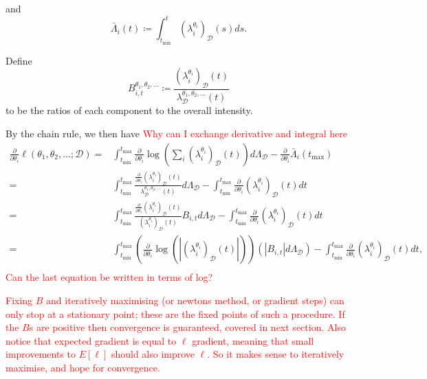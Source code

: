 \documentclass[honours,12pt]{unswthesis}
\numberwithin{equation}{section}
\begin{document}
and
$$\bar\Lambda_i(t) \coloneq \int_{t_\mathrm{min}}^t \left(\lambda_i^{\theta_i}\right)_\mathcal{D}(s)ds.$$

Define
$$B_{i,t}^{\theta_1,\theta_2,\ldots} \coloneq \frac{\left(\lambda_i^{\theta_i}\right)_\mathcal{D}(t)}{\lambda_\mathcal{D}^{\theta_1,\theta_2,\ldots}(t)}$$
to be the ratios of each component to the overall intensity.

By the chain rule, we then have
\textcolor{red}{Why can I exchange derivative and integral here}
\begin{equation*}
	\begin{align}
		\frac{\partial}{\partial \theta_i}\ell(\theta_1,\theta_2,\ldots;\mathcal{D})
		= & \int_{t_\mathrm{min}}^{t_\mathrm{max}}\frac{\partial}{\partial\theta_i}\log\left(\sum_i \left(\lambda_i^{\theta_i}\right)_\mathcal{D}(t)\right)d\Lambda_\mathcal{D} - \frac{\partial}{\partial\theta_i}\bar\Lambda_i(t_\mathrm{max})\\
		= & \int_{t_\mathrm{min}}^{t_\mathrm{max}}\frac{\frac{\partial}{\partial\theta_i}\left(\lambda_i^{\theta_i}\right)_\mathcal{D}(t)}{\lambda^{\theta_1,\theta_2,\ldots}_\mathcal{D}(t)}d\Lambda_\mathcal{D} - \int_{t_\mathrm{min}}^{t_\mathrm{max}}\frac{\partial}{\partial\theta_i}\left(\lambda_i^{\theta_i}\right)_\mathcal{D}(t)dt\\
		= & \int_{t_\mathrm{min}}^{t_\mathrm{max}}\frac{\frac{\partial}{\partial\theta_i}\left(\lambda_i^{\theta_i}\right)_\mathcal{D}(t)}{\left(\lambda_i^{\theta_i}\right)_\mathcal{D}(t)}B_{i,t}d\Lambda_\mathcal{D} - \int_{t_\mathrm{min}}^{t_\mathrm{max}}\frac{\partial}{\partial\theta_i}\left(\lambda_i^{\theta_i}\right)_\mathcal{D}(t)dt\\
		= & \int_{t_\mathrm{min}}^{t_\mathrm{max}} \left(\frac{\partial}{\partial\theta_i}\log\left(\left\vert\left(\lambda_i^{\theta_i}\right)_\mathcal{D}(t)\right\vert\right)\right) \left(\left\vert B_{i,t}\right\vert d\Lambda_\mathcal{D}\right) - \int_{t_\mathrm{min}}^{t_\mathrm{max}}\frac{\partial}{\partial\theta_i}\left(\lambda_i^{\theta_i}\right)_\mathcal{D}(t)dt,\\
	\end{align}
\end{equation*}
\textcolor{red}{Can the last equation be written in terms of log?}

\textcolor{red}{Fixing $B$ and iteratively maximising (or newtons method, or gradient steps) can only stop at a stationary point; these are the fixed points of such a procedure. If the $B$s are positive then convergence is guaranteed, covered in next section. Also notice that expected gradient is equal to $\ell$ gradient, meaning that small improvements to $E[\ell]$ should also improve $\ell$. So it makes sense to iteratively maximise, and hope for convergence.}
\end{document}
